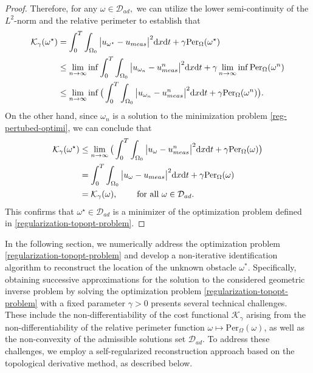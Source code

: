 \documentclass[a4paper,12pt,reqno,natbib]{amsart}
\newcommand{\dx} {\displaystyle\mathrm{d}x}
\newcommand{\dt} {\displaystyle\mathrm{d}t}
\begin{document}
\begin{proof}
\noindent Therefore, for any $\omega\in\mathcal{D}_{ad},$ we can utilize the lower semi-continuity of the $L^2$-norm and the relative perimeter to establish that
\begin{align*}
\mathcal{K}_\gamma(\omega^\star)&=\int_0^T\int_{\Omega_0}\big|u_{\omega^\star}-
u_{meas}\big|^2\dx\dt+\gamma\hbox{Per}_\Omega(\omega^\star)\\
&\leq\lim_{n\rightarrow\infty}\inf\int_0^T\int_{\Omega_0}\big|u_{\omega_n}-
u_{meas}^n\big|^2\dx\dt+\gamma\lim_{n\rightarrow\infty}\inf\hbox{Per}_\Omega(\omega^n)\\
&\leq\lim_{n\rightarrow\infty}\inf\big(\int_0^T\int_{\Omega_0}\big|u_{\omega_n}-
u_{meas}^n\big|^2\dx\dt+\gamma\hbox{Per}_\Omega(\omega^n)\big).
\end{align*}
On the other hand, since $\omega_n$ is a solution to the minimization problem \eqref{reg-pertubed-optimi}, we can conclude that
\begin{align*}
\mathcal{K}_\gamma(\omega^\star)&\leq\lim_{n\rightarrow\infty}\big(\int_0^T\int_{\Omega_0}\big|u_{\omega}-
u_{meas}^n\big|^2\dx\dt+\gamma\hbox{Per}_\Omega(\omega)\big)\\
&=\int_0^T\int_{\Omega_0}\big|u_{\omega}-
u_{meas}\big|^2\dx\dt+\gamma\hbox{Per}_\Omega(\omega)\\
&=\mathcal{K}_\gamma(\omega), \qquad \;\text{for all }
\omega\in\mathcal{D}_{ad}.
\end{align*}
This confirms that $\omega^\star\in\mathcal{D}_{ad}$ is a minimizer of the optimization problem defined in \eqref{regularization-topopt-problem}.
\end{proof}



In the following section, we numerically address the optimization problem \eqref{regularization-topopt-problem} and develop a non-iterative identification algorithm to reconstruct the location of the unknown obstacle $\omega^*$. Specifically, obtaining successive approximations for the solution to the considered geometric inverse problem by solving the optimization problem \eqref{regularization-topopt-problem} with a fixed parameter $\gamma>0$ presents several technical challenges. These include the non-differentiability of the cost functional $\mathcal{K}_\gamma$ arising from the non-differentiability of the relative perimeter function $\omega\longmapsto\text{Per}_\Omega(\omega)$, as well as the non-convexity of the admissible solutions set $\mathcal{D}_{ad}$. To address these challenges, we employ a self-regularized reconstruction approach based on the topological derivative method, as described below.
\end{document}
